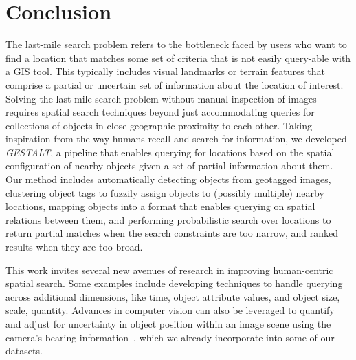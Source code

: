 \section{Conclusion}
\label{section:conclusion}

The last-mile search problem refers to the bottleneck faced by users who want to find a location that matches some set of criteria that is not easily query-able with a GIS tool.
This typically includes visual landmarks or terrain features that comprise a partial or uncertain set of information about the location of interest.
Solving the last-mile search problem without manual inspection of images requires spatial search techniques beyond just accommodating queries for collections of objects in close geographic proximity to each other.
Taking inspiration from the way humans recall and search for information, we developed \emph{GESTALT}, a pipeline that enables querying for locations based on the spatial configuration of nearby objects given a set of partial information about them.
Our method includes automatically detecting objects from geotagged images, clustering object tags to fuzzily assign objects to (possibly multiple) nearby locations, mapping objects into a format that enables querying on spatial relations between them, and performing probabilistic search over locations to return partial matches when the search constraints are too narrow, and ranked results when they are too broad.


This work invites several new avenues of research in improving human-centric spatial search.
Some examples include developing techniques to handle querying across additional dimensions, like time, object attribute values, and object size, scale, quantity.
Advances in computer vision can also be leveraged to quantify and adjust for uncertainty in object position within an image scene using the camera's bearing information~\cite{Ming2021,Liu2020,Snavely2011,Hays2008}, which we already incorporate into some of our datasets.




